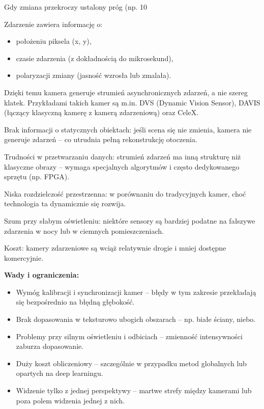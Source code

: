 \documentclass[magisterska]{pracadypl}
\begin{document}
Gdy zmiana przekroczy ustalony próg (np. 10%

Zdarzenie zawiera informację o:

\begin{itemize}
  \item położeniu piksela (x, y),

  \item czasie zdarzenia (z dokładnością do mikrosekund),

  \item polaryzacji zmiany (jasność wzrosła lub zmalała).
\end{itemize}

Dzięki temu kamera generuje strumień asynchronicznych zdarzeń, a nie szereg klatek. Przykładami takich kamer są m.in. DVS (Dynamic Vision Sensor), DAVIS (łączący klasyczną kamerę z kamerą zdarzeniową) oraz CeleX.

Brak informacji o statycznych obiektach: jeśli scena się nie zmienia, kamera nie generuje zdarzeń – co utrudnia pełną rekonstrukcję otoczenia.

Trudności w przetwarzaniu danych: strumień zdarzeń ma inną strukturę niż klasyczne obrazy – wymaga specjalnych algorytmów i często dedykowanego sprzętu (np. FPGA).

Niska rozdzielczość przestrzenna: w porównaniu do tradycyjnych kamer, choć technologia ta dynamicznie się rozwija.

Szum przy słabym oświetleniu: niektóre sensory są bardziej podatne na fałszywe zdarzenia w nocy lub w ciemnych pomieszczeniach.

Koszt: kamery zdarzeniowe są wciąż relatywnie drogie i mniej dostępne komercyjnie.

\begin{minipage}[t]{\textwidth}
\textbf{Wady i ograniczenia:}
\begin{itemize}
  \item Wymóg kalibracji i synchronizacji kamer – błędy w tym zakresie przekładają się bezpośrednio na błędną głębokość.

  \item Brak dopasowania w teksturowo ubogich obszarach – np. białe ściany, niebo.

  \item Problemy przy silnym oświetleniu i odbiciach – zmienność intensywności zaburza dopasowanie.

  \item Duży koszt obliczeniowy – szczególnie w przypadku metod globalnych lub opartych na deep learningu.

  \item Widzenie tylko z jednej perspektywy – martwe strefy między kamerami lub poza polem widzenia jednej z nich.
\end{itemize}
\end{minipage}
\end{document}
